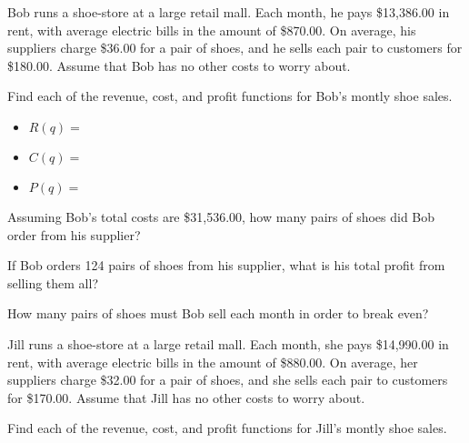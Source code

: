 \documentclass[12pt,legalpaper]{exam}
\newcommand{\smsp}{\vspace{0.25cm}}
\begin{document}
\begin{questions}
\question[5] Bob runs a shoe-store at a large retail mall.  Each month, he pays \$13,386.00 in rent, with average electric bills in the amount of \$870.00.  On average, his suppliers charge \$36.00 for a pair of shoes, and he sells each pair to customers for \$180.00.  Assume that Bob has no other costs to worry about.
\begin{compactenum}[(a)]
\item Find each of the revenue, cost, and profit functions for Bob's montly shoe sales.
\vspace{1cm}

\begin{itemize}
\item[] $R(q) =$
\vspace{1.5cm}

\item[] $C(q) =$
\vspace{1.5cm}

\item[] $P(q) =$
\end{itemize}
\vspace{1.5cm}

\smsp

\item Assuming Bob's total costs are \$31,536.00, how many pairs of shoes did Bob order from his supplier?
\vfill

\item If Bob orders 124 pairs of shoes from his supplier, what is his total profit from selling them all?
\vfill

\item How many pairs of shoes must Bob sell each month in order to break even?
\vfill
\end{compactenum}
\newpage

\question[5] Jill runs a shoe-store at a large retail mall.  Each month, she pays \$14,990.00 in rent, with average electric bills in the amount of \$880.00.  On average, her suppliers charge \$32.00 for a pair of shoes, and she sells each pair to customers for \$170.00.  Assume that Jill has no other costs to worry about.
\begin{compactenum}[(a)]
\item Find each of the revenue, cost, and profit functions for Jill's montly shoe sales.
\vspace{1cm}


\end{compactenum}
\end{questions}
\end{document}
